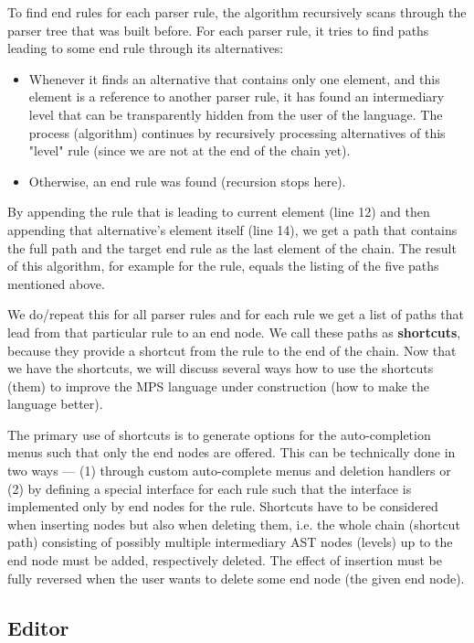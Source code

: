 To find end rules for each parser rule, the algorithm recursively scans through the parser tree that was built before.
For each parser rule, it tries to find paths leading to some end rule through its alternatives:
\begin{itemize}
	\item Whenever it finds an alternative that contains only one element, and this element is a reference to another parser rule, it has found an intermediary level that can be transparently hidden from the user of the language.
		The process (algorithm) continues by recursively processing alternatives of this "level" rule (since we are not at the end of the chain yet).
	\item Otherwise, an end rule was found (recursion stops here).
\end{itemize}

By appending the rule that is leading to current element (line 12) and then appending that alternative's element itself (line 14), we get a path that contains the full path and the target end rule as the last element of the chain.
The result of this algorithm, for example for the  rule, equals the listing of the five paths mentioned above.

We do/repeat this for all parser rules and for each rule we get a list of paths that lead from that particular rule to an end node.
We call these paths as \textbf{shortcuts}, because they provide a shortcut from the rule to the end of the chain.
Now that we have the shortcuts, we will discuss several ways how to use the shortcuts (them) to improve the MPS language under construction (how to make the language better).

The primary use of shortcuts is to generate options for the auto-completion menus such that only the end nodes are offered.
This can be technically done in two ways --- (1) through custom auto-complete menus and deletion handlers or (2) by defining a special interface for each rule such that the interface is implemented only by end nodes for the rule.
Shortcuts have to be considered when inserting nodes but also when deleting them, i.e. the whole chain (shortcut path) consisting of possibly multiple intermediary AST nodes (levels) up to the end node must be added, respectively deleted.
The effect of insertion must be fully reversed when the user wants to delete some end node (the given end node).

\subsection{Editor}

